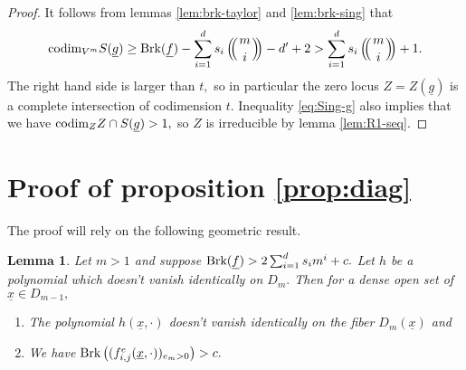 \documentclass[12pt]{amsart}
\let\ul\underline
\newtheorem{lemma}[theorem]{Lemma}
\theoremstyle{definition}
\def\multiset#1#2{\ensuremath{\left(\kern-.3em\left(\genfrac{}{}{0pt}{}{#1}{#2}\right)\kern-.3em\right)}}
\newcommand{\codim}{\textnormal{codim}}
\newcommand{\brk}{\textnormal{Brk}}
\let\ul\underline
\begin{document}
\begin{proof}
    It follows from lemmas \ref{lem:brk-taylor} and \ref{lem:brk-sing} that
    \begin{equation}\label{eq:Sing-g}
        \codim_{V^m} S(\ul{g}) \ge \brk(\ul{f})-\sum_{i=1}^d s_i \multiset{m}{i}-d'+2 > \sum_{i=1}^d s_i \multiset{m}{i}+1.
    \end{equation}
    The right hand side is larger than $t,$ so in particular the zero locus $Z = Z(\ul{g})$ is a complete intersection of codimension $t.$ Inequality \eqref{eq:Sing-g} also implies that we have $\codim_Z Z\cap S(\ul{g}) > 1,$ so $Z$ is irreducible by lemma \ref{lem:R1-seq}.
\end{proof}




\section{Proof of proposition \ref{prop:diag}}

The proof will rely on the following geometric result.

\begin{lemma}\label{lem:diag-on-subspace-geo}
    Let $m>1$ and suppose  $\brk(\ul{f}) > 2\sum_{i=1}^d s_i m^i+c.$ Let $h$ be a polynomial which doesn't vanish identically on $D_m.$ Then for a dense open set of $\ul{x}\in D_{m-1},$  
    \begin{enumerate}
        \item The polynomial $h(\ul{x},\cdot)$ doesn't vanish identically on the fiber $D_{m}(\ul{x})$ and 
        \item We have $\brk \left( (f_{i,j}^e(\ul{x},\cdot))_{e_m>0} \right) > c.$ 
    \end{enumerate}
\end{lemma}
\end{document}
